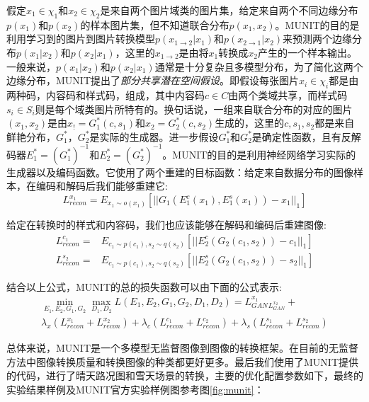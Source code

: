 假定$x_1\in \chi_1$和$x_2\in \chi_2$是来自两个图片域类的图片集，给定来自两个不同边缘分布$p(x_1)$和$p(x_2)$的样本图片集，但不知道联合分布$p(x_1, x_2)$。MUNIT的目的是利用学习到的图片到图片转换模型$p(x_{1\to 2}|x_1)$和$p(x_{2\to 1}|x_2)$来预测两个边缘分布$p(x_1|x_2)$和$p(x_2|x_1)$，这里的$x_{1\to 2}$是由将$x_1$转换成$x_2$产生的一个样本输出。一般来说，$p(x_1|x_2)$和$p(x_2|x_1)$通常是十分复杂且多模型分布，为了简化这两个边缘分布，MUNIT提出了\textit{部分共享潜在空间假设}。即假设每张图片$x_i\in \chi_i$都是由两种码，内容码和样式码，组成，其中内容码$c\in C$由两个类域共享，而样式码$s_i\in S_i$则是每个域类图片所特有的。换句话说，一组来自联合分布的对应的图片$(x_1, x_2)$是由$x_!=G_1^*(c,s_1)$和$x_2=G_2^*(c, s_2)$生成的，这里的$c,s_1,s_2$都是来自鲜艳分布，$G_1^*，G_2^*$是实际的生成器。进一步假设$G_1^*$和$G_2^*$是确定性函数，且有反解码器$E_1^*=(G_1^*)^{-1}$和$E_2^*=(G_2^*)^{-1}$。MUNIT的目的是利用神经网络学习实际的生成器以及编码函数。它使用了两个重建的目标函数：给定来自数据分布的图像样本，在编码和解码后我们能够重建它:
$$L_{recon}^{x_1}=E_{x_1\sim o(x_1)}[||G_1(E_1^c(x_1), E_1^s(x_1))-x_1||_1] $$

给定在转换时的样式和内容码，我们也应该能够在解码和编码后重建图像:
\begin{align*}
    L_{recon}^{c_1}= & E_{c_1\sim p(c_1), s_2\sim q(s_2)}[||E_2^c(G_2(c_1,s_2))-c_1||_1] \\
    L_{recon}^{s_2}= & E_{c_1\sim p(c_1), s_2\sim q(s_2)}[||E_2^s(G_2(c_1, s_2))-s_2||_1]
\end{align*}

结合以上公式，MUNIT的总的损失函数可以由下面的公式表示:
\begin{gather*}
\min_{E_1,E_2,G_1,G_2}\max_{D_1,D_2}L(E_1,E_2,G_1,G_2,D_1,D_2)=L_{GAN}^{x_1}_L_{GAN}^{x_2}+\\
\lambda_x(L_{recon}^{x_1}+L_{recon}^{x_2})+\lambda_c(L_{recon}^{c_1}+L_{recon}^{c_2})+\lambda_s(L_{recon}^{s_1}+L_{recon}^{s_2})
\end{gather*}

总体来说，MUNIT是一个多模型无监督图像到图像的转换框架。在目前的无监督方法中图像转换质量和转换图像的种类都更好更多。最后我们使用了MUNIT提供的代码，进行了晴天路况图和雪天场景的转换，主要的优化配置参数如下，最终的实验结果样例及MUNIT官方实验样例图参考图\ref{fig:munit}：

